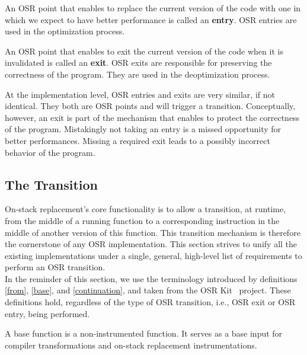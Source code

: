 \begin{definition}\label{OSREntryDefinition}
An OSR point that enables to replace the current version of the code with one in which we expect to have better performance is called an \textbf{entry}.
OSR entries are used in the optimization process.
\end{definition}

\begin{definition}
An OSR point that enables to exit the current version of the code when it is invalidated is called an \textbf{exit}.
OSR exits are responsible for preserving the correctness of the program.
They are used in the deoptimization process.
\end{definition}

At the implementation level, OSR entries and exits are very similar, if not identical. 
They both are OSR points and will trigger a transition.
Conceptually, however, an exit is part of the mechanism that enables to protect the correctness of the program.
Mistakingly not taking an entry is a missed opportunity for better performances.
Missing a required exit leads to a possibly incorrect behavior of the program.\\

\subsection{The Transition}
On-stack replacement's core functionality is to allow a transition, at runtime, from the middle of a running function to a corresponding instruction in the middle of another version of this function.
This transition mechanism is therefore the cornerstone of any OSR implementation.
This section strives to unify all the existing implementations under a single, general, high-level list of requirements to perform an OSR transition.\\

In the reminder of this section, we use the terminology introduced by definitions \ref{from}, \ref{base}, and \ref{continuation}, and taken from the OSR Kit~\cite{OSRKit} project.
These definitions hold, regardless of the type of OSR transition, i.e., OSR exit or OSR entry, being performed.\\

\begin{definition}\label{base}
A base function is a non-instrumented function. 
It serves as a base input for compiler transformations and on-stack replacement instrumentations.
\end{definition}

